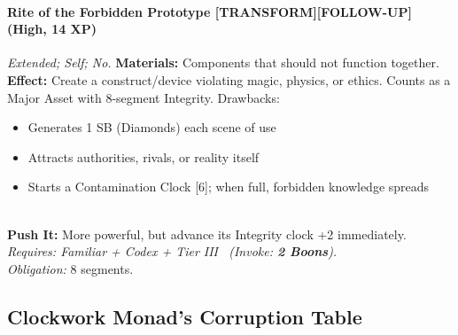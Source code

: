 \paragraph{Rite of the Forbidden Prototype \textnormal{[TRANSFORM][FOLLOW-UP]} (High, 14 XP)} \emph{Extended; Self; No.}
\textbf{Materials:} Components that should not function together. \\
\textbf{Effect:} Create a construct/device violating magic, physics, or ethics. Counts as a Major Asset with 8-segment Integrity. Drawbacks:
\begin{itemize}
  \item Generates 1 SB (Diamonds) each scene of use
  \item Attracts authorities, rivals, or reality itself
  \item Starts a Contamination Clock [6]; when full, forbidden knowledge spreads
\end{itemize} \\
\textbf{Push It:} More powerful, but advance its Integrity clock +2 immediately. \\
\emph{Requires: Familiar + Codex + Tier III \ (\textit{Invoke:} \textbf{2 Boons}).} \\
\emph{Obligation:} 8 segments.

\subsection*{Clockwork Monad's Corruption Table}
\label{sec:monad-corruption}

